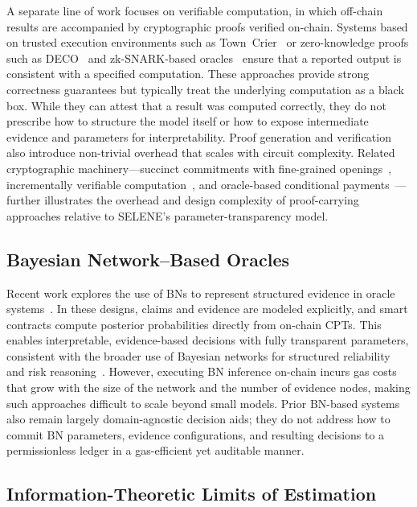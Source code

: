 \documentclass[journal]{IEEEtran}
\theoremstyle{definition}
\theoremstyle{remark}
\begin{document}
A separate line of work focuses on verifiable
computation, in which off-chain results are accompanied
by cryptographic proofs verified on-chain.
Systems based on trusted execution environments such as
Town~Crier~\cite{zhang2016town} or zero-knowledge
proofs such as DECO~\cite{zhang2020deco} and
zk-SNARK-based oracles~\cite{garg2022succinct} ensure
that a reported output is consistent with a specified
computation.
These approaches provide strong correctness guarantees
but typically treat the underlying computation as a
black box.
While they can attest that a result was computed
correctly, they do not prescribe how to structure the
model itself or how to expose intermediate evidence and
parameters for interpretability.
Proof generation and verification also introduce
non-trivial overhead that scales with circuit complexity.
Related cryptographic machinery---succinct commitments with
fine-grained openings~\cite{kolonelos2023succinct},
incrementally verifiable
computation~\cite{datta2025incrementally}, and
oracle-based conditional
payments~\cite{madathil2022cryptographic}---further
illustrates the overhead and design complexity of
proof-carrying approaches relative to SELENE's
parameter-transparency model.

\subsection{Bayesian Network--Based Oracles}

Recent work explores the use of BNs to represent
structured evidence in oracle systems~\cite{naeem2025evidence}.
In these designs, claims and evidence are modeled
explicitly, and smart contracts compute posterior
probabilities directly from on-chain CPTs.
This enables interpretable, evidence-based decisions
with fully transparent parameters, consistent with the
broader use of Bayesian networks for structured reliability
and risk reasoning~\cite{wang2025application}.
However, executing BN inference on-chain incurs gas
costs that grow with the size of the network and the
number of evidence nodes, making such approaches
difficult to scale beyond small models.
Prior BN-based systems also remain largely
domain-agnostic decision aids; they do not address how
to commit BN parameters, evidence configurations, and
resulting decisions to a permissionless ledger in a
gas-efficient yet auditable manner.

\subsection{Information-Theoretic Limits of Estimation}
\end{document}
